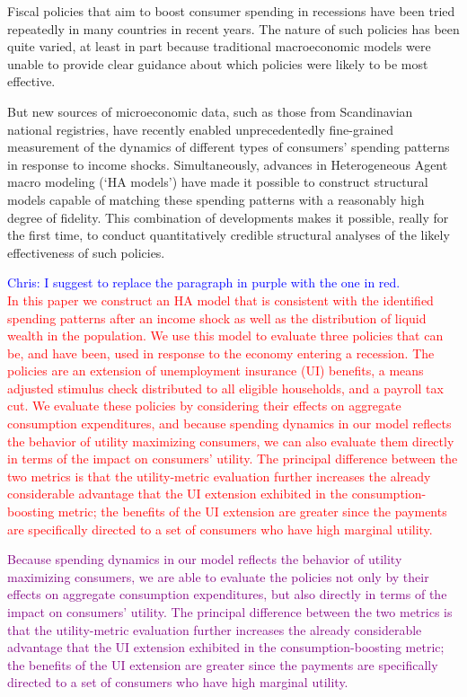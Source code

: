 \documentclass[../HAFiscal]{subfiles}
\begin{document}
Fiscal policies that aim to boost consumer spending in recessions have been tried repeatedly in many countries in recent years.  The nature of such policies has been quite varied, at least in part because traditional macroeconomic models were unable to provide clear guidance about which policies were likely to be most effective.

But new sources of microeconomic data, such as those from Scandinavian national registries, have recently enabled unprecedentedly fine-grained measurement of the dynamics of different types of consumers' spending patterns in response to income shocks.  Simultaneously, advances in Heterogeneous Agent macro modeling (`HA models') have made it possible to construct structural models capable of matching these spending patterns with a reasonably high degree of fidelity.  This combination of developments makes it possible, really for the first time, to conduct quantitatively credible structural analyses of the likely effectiveness of such policies.

\textcolor{blue}{Chris: I suggest to replace the paragraph in purple with the one in red.\\}
\textcolor{red}{
 In this paper we construct an HA model that is consistent with the identified spending patterns after an income shock as well as the distribution of liquid wealth in the population. We use this model to evaluate three policies that can be, and have been, used in response to the economy entering a recession. The policies are an extension of unemployment insurance (UI) benefits, a means adjusted stimulus check distributed to all eligible households, and a payroll tax cut. We evaluate these policies by considering their effects on aggregate consumption expenditures, and because spending dynamics in our model reflects the behavior of utility maximizing consumers, we can also evaluate them directly in terms of the impact on consumers' utility. The principal difference between the two metrics is that the utility-metric evaluation further increases the already considerable advantage that the UI extension exhibited in the consumption-boosting metric; the benefits of the UI extension are greater since the payments are specifically directed to a set of consumers who have high marginal utility.}

\textcolor{purple}{
Because spending dynamics in our model reflects the behavior of utility maximizing consumers, we are able to evaluate the policies not only by their effects on aggregate consumption expenditures, but also directly in terms of the impact on consumers' utility.  The principal difference between the two metrics is that the utility-metric evaluation further increases the already considerable advantage that the UI extension exhibited in the consumption-boosting metric; the benefits of the UI extension are greater since the payments are specifically directed to a set of consumers who have high marginal utility.}
\end{document}
